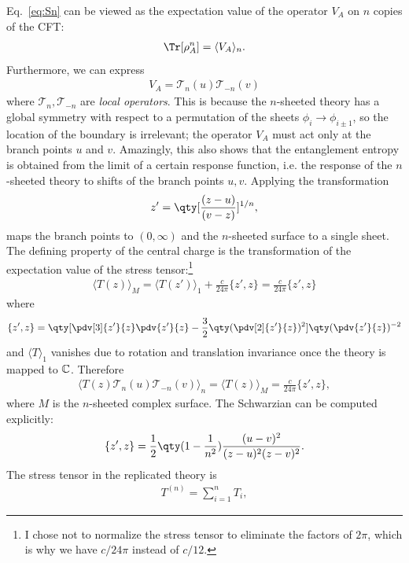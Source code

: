 Eq.~\eqref{eq:Sn} can be viewed as the expectation value of the operator $V_A$
on $n$ copies of the CFT:
\begin{align}
\Tr[\rho_A^n]  = \langle  V_A \rangle_n.
\end{align}
Furthermore, we can express
\begin{align}
  V_A = \mathcal T_n(u) \mathcal T_{-n}(v)
\end{align}
where $\mathcal T_{n}, \mathcal T_{-n}$ are \emph{local operators}. This is because the
$n$-sheeted theory has a global symmetry with respect to a permutation of the
sheets $\phi_i \to \phi_{i\pm 1}$, so the location of the boundary is
irrelevant; the operator $V_A$ must act only at the branch points $u$ and $v$.
Amazingly, this also shows that the entanglement entropy is obtained from the limit of a
certain response function, i.e. the response of the $n$-sheeted theory to shifts
of the branch points $u,v$.
Applying the transformation
\begin{align}
z' = \qty[\frac{(z-u)}{(v-z)}]^{1/n},
\end{align}
maps the branch points to $(0,\infty)$ and the $n$-sheeted surface to a single
sheet. 
The defining property of the central charge is the transformation of the
expectation value of the stress tensor:\footnote{I chose not to normalize the
  stress tensor to eliminate the factors of $2\pi$, which is why we have
  $c/24\pi$ instead of $c/12$.}
\begin{align}
\langle  T(z) \rangle_{M} = \langle T(z') \rangle_{1} + \frac{c}{24\pi}\{z', z\} = \frac{c}{24\pi}\{z', z\}\label{eq:anomaly}
\end{align}
where
\begin{align}
\{z', z\} = \qty[\pdv[3]{z'}{z}\pdv{z'}{z} - \frac{3}{2}\qty(\pdv[2]{z'}{z})^2]\qty(\pdv{z'}{z})^{-2}\label{eq:schwarzian}
\end{align}
and $\langle T \rangle_{1}$ vanishes due to rotation and translation invariance
once the theory is mapped to $\mathbb C$. 
Therefore
\begin{align}
\langle  T(z)\mathcal T_n(u)\mathcal T_{-n}(v) \rangle_{n} = \langle  T(z) \rangle_{M} = \frac{c}{24\pi}\{z', z\},
\end{align}
where $M$ is the $n$-sheeted complex surface. The
Schwarzian can be computed explicitly:
\begin{align}
\{z', z\} = \frac{1}{2}\qty(1-\frac{1}{n^2})\frac{(u-v)^2}{(z-u)^2(z-v)^2}.
\end{align}
The stress tensor in the replicated theory is
\begin{align}
T^{(n)} = \sum_{i =1}^n T_i,
\end{align}
